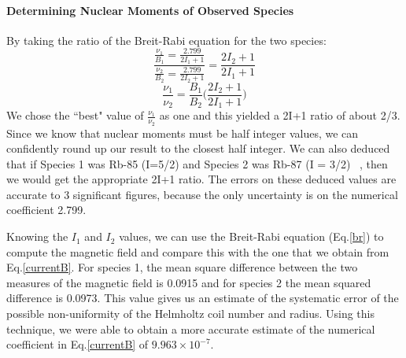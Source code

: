 \documentclass{sigchi}
\begin{document}
\paragraph{Determining Nuclear Moments of Observed Species}
\par By taking the ratio of the Breit-Rabi equation for the two species: 
\begin{equation*}
\frac{\frac{\nu_1}{B_1} = \frac{2.799}{2I_1+1}}{\frac{\nu_2}{B_2} = \frac{2.799}{2I_2+1}} = \frac{2I_2+1}{2I_1+1}
\end{equation*}
\begin{equation*}
\frac{\nu_1}{\nu_2} = \frac{B_1}{B_2}\Bigg(\frac{2I_2+1}{2I_1+1}\Bigg)
\end{equation*}
We chose the ``best" value of $\frac{\nu_1}{\nu_2} $ as one and this yielded a 2I+1 ratio of about 2/3. Since we know that nuclear moments must be half integer values, we can confidently round up our result to the closest half integer. We can also  deduced that if Species 1 was Rb-85 (I=5/2) and Species 2 was Rb-87 (I = 3/2) ~\cite{PhysRev}, then we would get the appropriate 2I+1 ratio. The errors on these deduced values are accurate to 3 significant figures, because the only uncertainty is on the numerical coefficient 2.799. 
\par Knowing the $I_1$ and $I_2$ values, we can use the Breit-Rabi equation (Eq.\ref{br}) to compute the magnetic field and compare this with the one that we obtain from Eq.\ref{currentB}. For species 1, the mean square difference between the two measures of the magnetic field is 0.0915 and for species 2 the mean squared difference is 0.0973. This value gives us an estimate of the systematic error of the possible non-uniformity of the Helmholtz coil number and radius.  Using this technique, we were able to obtain a more accurate estimate of the numerical coefficient in Eq.\ref{currentB} of  $9.963\times 10^{-7}$. 
\end{document}
